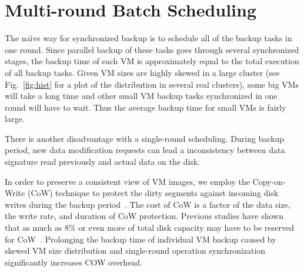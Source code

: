 \section{Multi-round Batch Scheduling}
\label{sect:scheduling}
The na\"{\i}ve way for synchronized backup is to schedule all of the backup tasks in one round.
Since parallel backup of these tasks goes through several synchronized stages,
the backup time of each VM is approximately equal to the total execution of all backup tasks.
Given VM sizes are highly skewed in a large cluster (see Fig.~\ref{fig:hist} for a plot of the distribution in several real clusters), some big VMs will take a long time and other
small VM backup tasks synchronized in one round will have to wait.
Thus the average backup time for small VMs is fairly large. 


There is another disadvantage with a single-round scheduling. 
During backup period, new data modification requests can lead a inconsistency between data signature 
read previously and actual data on the disk.


In order to preserve a consistent view of VM images, we employ
the Copy-on-Write (CoW) technique to protect the dirty segments against incoming disk writes during 
the backup period~\cite{VMare2013}. 
The cost of CoW is a factor of the data size, the write rate, and duration of CoW protection.
Previous studies have shown that as much as 8\% or even more of total disk capacity may have to be 
reserved for CoW~\cite{EMCIncrementalDataChanges}.
Prolonging the backup time of individual VM backup  caused by skewed VM size distribution
and single-round operation synchronization significantly increases COW overhead.

